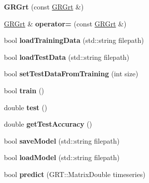 \begin{DoxyCompactItemize}
\item 
\mbox{\label{classGRGrt_aa6510bae51d0f3d2c6af5ee3852cff38}} 
{\bfseries G\+R\+Grt} (const \mbox{\hyperlink{classGRGrt}{G\+R\+Grt}} \&)
\item 
\mbox{\label{classGRGrt_ac386df585523d57c0f45eab413075b3f}} 
\mbox{\hyperlink{classGRGrt}{G\+R\+Grt}} \& {\bfseries operator=} (const \mbox{\hyperlink{classGRGrt}{G\+R\+Grt}} \&)
\item 
\mbox{\label{classGRGrt_a734acc0c43d8a1a326c8107f1b5d8ed3}} 
bool {\bfseries load\+Training\+Data} (std\+::string filepath)
\item 
\mbox{\label{classGRGrt_ac254a3cd3a2057665da563de0f763f87}} 
bool {\bfseries load\+Test\+Data} (std\+::string filepath)
\item 
\mbox{\label{classGRGrt_a9843133f434c214db226c4d5690113cb}} 
bool {\bfseries set\+Test\+Data\+From\+Training} (int size)
\item 
\mbox{\label{classGRGrt_a414538e216c5ab01569b11ddb27f3e16}} 
bool {\bfseries train} ()
\item 
\mbox{\label{classGRGrt_a274708474e42eab554bf5056da63c231}} 
double {\bfseries test} ()
\item 
\mbox{\label{classGRGrt_a1e78023522cece11f107d203ef3b1be7}} 
double {\bfseries get\+Test\+Accuracy} ()
\item 
\mbox{\label{classGRGrt_a20eb98bf5d0979c55cc4d91e1b191794}} 
bool {\bfseries save\+Model} (std\+::string filepath)
\item 
\mbox{\label{classGRGrt_a09f32336a2b089dadbf1c6e72ee55f2a}} 
bool {\bfseries load\+Model} (std\+::string filepath)
\item 
\mbox{\label{classGRGrt_ae1ec1de504ebc34eb3f7d553ca683584}} 
bool {\bfseries predict} (G\+R\+T\+::\+Matrix\+Double timeseries)
\item 
\mbox{\label{classGRGrt_a12807c23f6559c9b90d37b97fd07d07a}} 

\end{DoxyCompactItemize}
